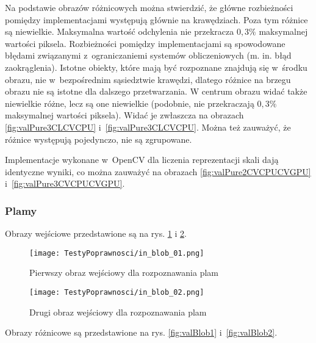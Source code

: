 Na podstawie obrazów różnicowych można stwierdzić, że główne rozbieżności pomiędzy implementacjami występują głównie na krawędziach. Poza tym różnice są niewielkie. Maksymalna wartość odchylenia nie przekracza $ 0,3\% $ maksymalnej wartości piksela. Rozbieżności pomiędzy implementacjami są spowodowane błędami związanymi z~ograniczaniemi systemów obliczeniowych (m. in. błąd zaokrąglenia). Istotne obiekty, które mają być rozpoznane znajdują się w~środku obrazu, nie w~bezpośrednim sąsiedztwie krawędzi, dlatego różnice na brzegu obrazu nie są istotne dla dalszego przetwarzania. W centrum obrazu widać także niewielkie różne, lecz są one niewielkie (podobnie, nie przekraczają $ 0,3\% $ maksymalnej wartości piksela). Widać je zwłaszcza na obrazach \ref{fig:valPure3CLCVCPU} i~\ref{fig:valPure3CLCVCPU}. Można też zauważyć, że różnice występują pojedynczo, nie są zgrupowane.

Implementacje wykonane w~OpenCV dla liczenia reprezentacji skali dają identyczne wyniki, co można zauważyć na obrazach \ref{fig:valPure2CVCPUCVGPU} i~\ref{fig:valPure3CVCPUCVGPU}.

\subsubsection{Plamy}
\label{subsubsec:plamyRysunki}

Obrazy wejściowe przedstawione są na rys. \ref{fig:valBlob01} i \ref{fig:valBlob02}.

\begin{figure}[h]
\begin{center}
\texttt{[image: TestyPoprawnosci/in\_blob\_01.png]}
\end{center}
\caption{Pierwszy obraz wejściowy dla rozpoznawania plam}
\label{fig:valBlob01}
\end{figure}

\begin{figure}[h]
\begin{center}
\texttt{[image: TestyPoprawnosci/in\_blob\_02.png]}
\end{center}
\caption{Drugi obraz wejściowy dla rozpoznawania plam}
\label{fig:valBlob02}
\end{figure}

Obrazy różnicowe są przedstawione na rys. \ref{fig:valBlob1} i~\ref{fig:valBlob2}. 

